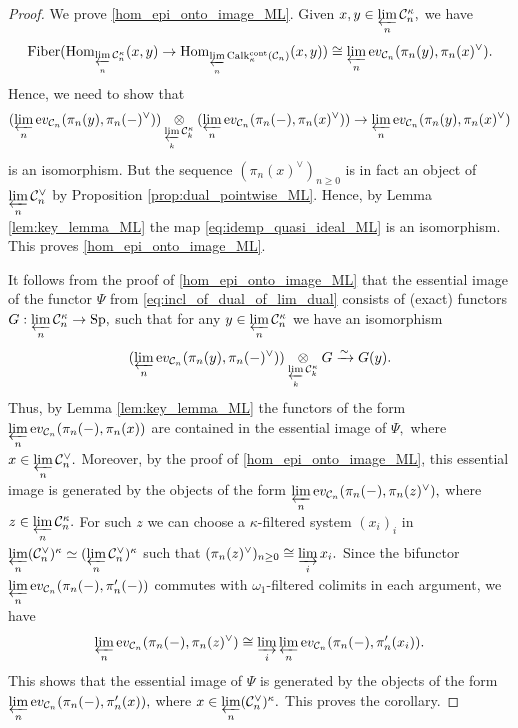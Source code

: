 \documentclass[11pt,leqno]{amsart}
\numberwithin{equation}{section}
\def\Hom{\operatorname{Hom}}
\newcommand{\tens}[1]{%
  \mathbin{\mathop{\otimes}\displaylimits_{#1}}%
}
\newcommand{\indlim}[1][]{\mathop{\varinjlim}\limits_{#1}}
\newcommand{\prolim}[1][]{\mathop{\varprojlim}\limits_{#1}}
\newcommand{\xto}{\xrightarrow}
\newcommand{\Fiber}{\operatorname{Fiber}}
\newcommand{\cont}{\operatorname{cont}}
\newcommand{\ev}{\mathrm ev}
\newcommand{\cC}{{\mathcal C}}
\newcommand{\Sp}{\operatorname{Sp}}
\newcommand{\Calk}{\operatorname{Calk}}
\begin{document}
\begin{proof}
We prove \ref{hom_epi_onto_image_ML}. Given $x,y\in\prolim[n]\cC_n^{\kappa},$ we have
\begin{equation*}
\Fiber(\Hom_{\prolim[n]\cC_n^{\kappa}}(x,y)\to \Hom_{\prolim[n]\Calk_{\kappa}^{\cont}(\cC_n)}(x,y))\cong \prolim[n]\ev_{\cC_n}(\pi_n(y),\pi_n(x)^{\vee}).
\end{equation*}
Hence, we need to show that
\begin{equation}
\label{eq:idemp_quasi_ideal_ML}(\prolim[n]\ev_{\cC_n}(\pi_n(y),\pi_n(-)^{\vee}))\tens{\prolim[k]\cC_k^{\kappa}}(\prolim[n]\ev_{\cC_n}(\pi_n(-),\pi_n(x)^{\vee}))\to \prolim[n]\ev_{\cC_n}(\pi_n(y),\pi_n(x)^{\vee})
\end{equation}
is an isomorphism. But the sequence $(\pi_n(x)^{\vee})_{n\geq 0}$ is in fact an object of $\prolim[n]\cC_n^{\vee}$ by Proposition \ref{prop:dual_pointwise_ML}. Hence, by Lemma \ref{lem:key_lemma_ML} the map \eqref{eq:idemp_quasi_ideal_ML} is an isomorphism. This proves \ref{hom_epi_onto_image_ML}.

It follows from the proof of \ref{hom_epi_onto_image_ML} that the essential image of the functor $\Psi$ from \eqref{eq:incl_of_dual_of_lim_dual} consists of (exact) functors $G:\prolim[n]\cC_n^{\kappa}\to\Sp,$ such that for any $y\in\prolim[n]\cC_n^{\kappa}$ we have an isomorphism
\begin{equation*}
(\prolim[n]\ev_{\cC_n}(\pi_n(y),\pi_n(-)^{\vee}))\tens{\prolim[k]\cC_k^{\kappa}}G\xto{\sim}G(y).
\end{equation*} 
Thus, by Lemma \ref{lem:key_lemma_ML} the functors of the form $\prolim[n]\ev_{\cC_n}(\pi_n(-),\pi_n(x))$ are contained in the essential image of $\Psi,$ where $x\in\prolim[n]\cC_n^{\vee}.$ Moreover, by the proof of \ref{hom_epi_onto_image_ML}, this essential image is generated by the objects of the form $\prolim[n]\ev_{\cC_n}(\pi_n(-),\pi_n(z)^{\vee}),$ where $z\in \prolim[n]\cC_n^{\kappa}.$ For such $z$ we can choose a $\kappa$-filtered system $(x_i)_i$ in $\prolim[n](\cC_n^{\vee})^{\kappa}\simeq (\prolim[n]\cC_n^{\vee})^{\kappa}$ such that $(\pi_n(z)^{\vee})_{n\geq 0}\cong \indlim[i]x_i.$ Since the bifunctor $\prolim[n]\ev_{\cC_n}(\pi_n(-),\pi_n^\prime(-))$ commutes with $\omega_1$-filtered colimits in each argument, we have
\begin{equation*}
\prolim[n]\ev_{\cC_n}(\pi_n(-),\pi_n(z)^{\vee})\cong \indlim[i]\prolim[n]\ev_{\cC_n}(\pi_n(-),\pi_n^\prime(x_i)).
\end{equation*}
This shows that the essential image of $\Psi$ is generated by the objects of the form $\prolim[n]\ev_{\cC_n}(\pi_n(-),\pi_n^\prime(x)),$ where $x\in\prolim[n](\cC_n^{\vee})^{\kappa}.$ This proves the corollary.
\end{proof}
\end{document}
